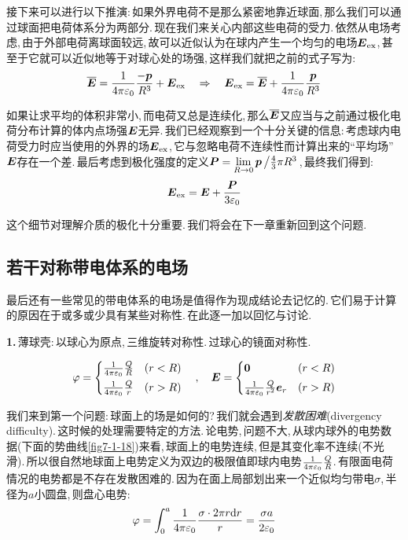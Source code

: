 接下来可以进行以下推演:\,如果外界电荷不是那么紧密地靠近球面,\,那么我们可以通过球面把电荷体系分为两部分.\,现在我们来关心内部这些电荷的受力.\,依然从电场考虑,\,由于外部电荷离球面较远,\,故可以近似认为在球内产生一个均匀的电场$\boldsymbol{E}_{\rm ex}$,\,甚至于它就可以近似地等于对球心处的场强,\,这样我们就把之前的式子写为:
\[\overline{\boldsymbol{E}}=\frac{1}{4\pi\varepsilon_0} \frac{-\boldsymbol{p}}{R^3}+\boldsymbol{E}_{\rm ex} \quad\Rightarrow \quad \boldsymbol{E}_{\rm ex}=\overline{\boldsymbol{E}}+\frac{1}{4\pi\varepsilon_0} \frac{\boldsymbol{p}}{R^3}\]

如果让求平均的体积非常小,\,而电荷又总是连续化,\,那么$\overline{\boldsymbol{E}}$又应当与之前通过极化电荷分布计算的体内点场强$\boldsymbol{E}$无异.\,我们已经观察到一个十分关键的信息:\,考虑球内电荷受力时应当使用的外界的场$\boldsymbol{E}_{\rm ex}$,\,它与忽略电荷不连续性而计算出来的``平均场''$\boldsymbol{E}$存在一个差.\,最后考虑到极化强度的定义$\boldsymbol{P}=\lim\limits_{R\to 0}\boldsymbol{p}\left/\frac{4}{3}\pi R^3\right.$,\,最终我们得到:
\[\boldsymbol{E}_{\rm ex}=\boldsymbol{E}+\frac{\boldsymbol{P}}{3\varepsilon_0}\]

这个细节对理解介质的极化十分重要.\,我们将会在下一章重新回到这个问题.

\subsection{若干对称带电体系的电场}

最后还有一些常见的带电体系的电场是值得作为现成结论去记忆的.\,它们易于计算的原因在于或多或少具有某些对称性.\,在此逐一加以回忆与讨论.

\vspace{0.3cm}
\textbf{1.}\,薄球壳:\,以球心为原点,\,三维旋转对称性.\,过球心的镜面对称性.

\[\varphi=\begin{cases} \frac{1}{4\pi\varepsilon_0} \frac{Q}{R}& (r<R) \\[3pt] \frac{1}{4\pi\varepsilon_0} \frac{Q}{r} & (r>R) \end{cases} \quad,	\quad \boldsymbol{E}=\begin{cases}  \boldsymbol{0} & (r<R) \\[3pt] \frac{1}{4\pi\varepsilon_0} \frac{Q}{r^2}\boldsymbol{e}_r & (r>R) \end{cases}\]

我们来到第一个问题:\,球面上的场是如何的?\,我们就会遇到\emph{发散困难}(divergency difficulty).\,这时候的处理需要特定的方法.\,论电势,\,问题不大,\,从球内球外的电势数据(下面的势曲线\ref{fig7-1-18})来看,\,球面上的电势连续,\,但是其变化率不连续(不光滑).\,所以很自然地球面上电势定义为双边的极限值即球内电势$\frac{1}{4\pi\varepsilon_0} \frac{Q}{R}$.\,有限面电荷情况的电势都是不存在发散困难的.\,因为在面上局部划出来一个近似均匀带电$\sigma$,\,半径为$a$小圆盘,\,则盘心电势:
\[\varphi=\int_0^a \frac{1}{4\pi\varepsilon_0} \frac{\sigma \cdot 2\pi r \textrm{d} r}{r}=\frac{\sigma a}{2\varepsilon_0}\]

